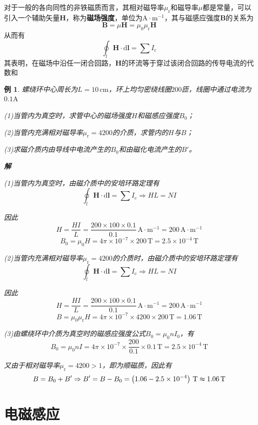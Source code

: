 \documentclass[12pt, a4paper, twoside]{ctexbook}
\newtheorem{example}[theorem]{例}
\begin{document}
对于一般的各向同性的非铁磁质而言，其相对磁导率$\mu_\mathrm{r}$和磁导率$\mu$都是常量，可以引入一个辅助矢量$\boldsymbol{H}$，称为\textbf{磁场强度}，单位为$\mathrm{A}\cdot\mathrm{m}^{-1}$，其与磁感应强度$\boldsymbol{B}$的关系为
$$
\boldsymbol{B}=\mu\boldsymbol{H}=\mu_0\mu_\mathrm{r}\boldsymbol{H}
$$
从而有
$$
\oint_l \boldsymbol{H}\cdot\mathrm{d}\boldsymbol{l}=\sum I_\mathrm{c}
$$
其表明，在磁场中沿任一闭合回路，$\boldsymbol{H}$的环流等于穿过该闭合回路的传导电流的代数和
\begin{example}
    螺绕环中心周长为$L=10\,\mathrm{cm}$，环上均匀密绕线圈$200$匝，线圈中通过电流为$0.1\mathrm{A}$

    (1)当管内为真空时，求管中心的磁场强度$H$和磁感应强度$B_0$；

    (2)当管内充满相对磁导率$\mu_\mathrm{r}=4200$的介质，求管内的$H$与$B$；

    (3)求磁介质内由导线中电流产生的$B_0$和由磁化电流产生的$B'$。

    \noindent\textbf{解}

    (1)当管内为真空时，由磁介质中的安培环路定理有
    $$
    \oint_l \boldsymbol{H}\cdot\mathrm{d}\boldsymbol{l}=\sum I_\mathrm{c} \Rightarrow HL=NI
    $$

    因此
    $$
    H=\frac{HI}{L}=\frac{200\times100\times0.1}{0.1}\,\mathrm{A}\cdot\mathrm{m}^{-1}=200\,\mathrm{A}\cdot\mathrm{m}^{-1}
    $$
    $$
    B_0=\mu_0 H=4\pi\times10^{-7}\times 200\,\mathrm{T}=2.5\times10^{-4}\,\mathrm{T}
    $$

    (2)当管内充满相对磁导率$\mu_\mathrm{r}=4200$的介质时，由磁介质中的安培环路定理有
    $$
    \oint_l \boldsymbol{H}\cdot\mathrm{d}\boldsymbol{l}=\sum I_\mathrm{c} \Rightarrow HL=NI
    $$

    因此
    $$
    H=\frac{HI}{L}=\frac{200\times100\times0.1}{0.1}\,\mathrm{A}\cdot\mathrm{m}^{-1}=200\,\mathrm{A}\cdot\mathrm{m}^{-1}
    $$
    $$
    B=\mu_0\mu_\mathrm{r}H=4\pi\times10^{-7}\times4200\times200\,\mathrm{T}=1.06\,\mathrm{T}
    $$

    (3)由螺绕环中介质为真空时的磁感应强度公式$B_0=\mu_0nI_0$，有
    $$
    B_0=\mu_0nI=4\pi\times10^{-7}\times\frac{200}{0.1}\times0.1\,\mathrm{T}=2.5\times10^{-4}\,\mathrm{T}
    $$

    又由于相对磁导率$\mu_\mathrm{r}=4200>1$，即为顺磁质，因此有
    $$
    B=B_0+B' \Rightarrow B'=B-B_0=\left(1.06-2.5\times10^{-4}\right)\,\mathrm{T}\thickapprox1.06\,\mathrm{T}
    $$
\end{example}
\chapter{电磁感应}
\newpage
\end{document}
